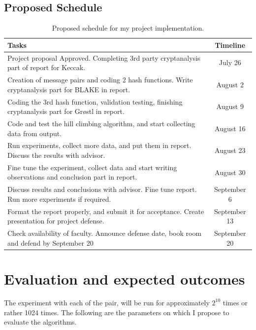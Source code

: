\documentclass[12pt]{artikel3}                  %
\begin{document}
\subsection{Proposed Schedule}
\begin{table}[h]
  \begin{center}
    \begin{tabular}{ | p{12cm} | c | } \hline
      Tasks                                                                                                   & Timeline \\ \hline
      Project proposal Approved. Completing 3rd party cryptanalysis part of report for Keccak.                & July 26 \\ \hline
      Creation of message pairs and coding 2 hash functions. Write cryptanalysis part for BLAKE in report.    & August 2 \\ \hline
      Coding the 3rd hash function, validation testing, finishing cryptanalysis part for Gr{\o}stl in report. & August 9 \\ \hline
      Code and test the hill climbing algorithm, and start collecting data from output.                       & August 16 \\ \hline
      Run experiments, collect more data, and put them in report. Discuss the results with advisor.           & August 23 \\ \hline
      Fine tune the experiment, collect data and start writing observations and conclusion part in report.    & August 30 \\ \hline
      Discuss results and conclusions with advisor. Fine tune report. Run more experiments if required.       & September 6 \\ \hline
      Format the report properly, and submit it for acceptance. Create presentation for project defense.      & September 13 \\ \hline
      Check availability of faculty. Announce defense date, book room and defend by September 20              & September 20 \\ \hline
    \end{tabular}
  \caption{Proposed schedule for my project implementation.}
  \end{center}
\end{table}

\section{Evaluation and expected outcomes}
The experiment with each of the pair, will be run for approximately $2^{10}$ times or rather 1024 times.
The following are the parameters on which I propose to evaluate the algorithms. 
\end{document}
